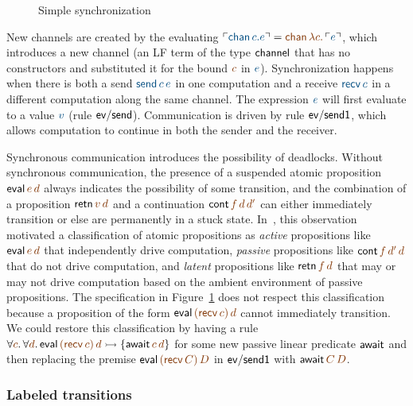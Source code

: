 \begin{figure}
\caption{Simple synchronization}
\label{fig:dest-synch}
\end{figure}

New channels are created by the evaluating $\interp{{\sf chan}\,c.e} =
\lf{{\sf chan}\,\lambda c.\,\interp{e}}$, which introduces a new channel
(an LF term of the type ${\sf channel}$ that has no constructors and
substituted it for the bound $\lf{c}$ in $\obj{e}$). 
Synchronization happens when
there is both a send $\obj{{\sf send}\,c\,e}$ in one computation and a
receive $\obj{{\sf recv}\,c}$ in a different computation along the same
channel. The expression $\obj{e}$ will first evaluate to a value $\obj{v}$ 
(rule ${\sf ev/send}$). Communication is
driven by rule ${\sf ev/send1}$, which allows computation to continue
in both the sender and the receiver.

Synchronous communication introduces the possibility of
deadlocks. Without synchronous communication, the presence of a
suspended atomic proposition ${\sf eval}\,\lf{e}\,\lf{d}$ always
indicates the possibility of some transition, and the combination of a
proposition ${\sf retn}\,\lf{v}\,\lf{d}$ and a continuation ${\sf
  cont}\,\lf{f}\,\lf{d}\,\lf{d'}$ can either immediately transition or
else are permanently in a stuck
state. In~\cite{pfenning09substructural}, this observation motivated a
classification of atomic propositions as {\it active} propositions
like ${\sf eval}\,\lf{e}\,\lf{d}$ that independently drive
computation, {\it passive} propositions like ${\sf
  cont}\,\lf{f}\,\lf{d'}\,\lf{d}$ that do not drive computation, and
{\it latent} propositions like ${\sf retn}\,\lf{f}\,\lf{d}$ that may
or may not drive computation based on the ambient environment of
passive propositions. The specification in Figure~\ref{fig:dest-synch}
does not respect this classification because a proposition of the form
${\sf eval}\,\lf{({\sf recv}\,c)}\,\lf{d}$ cannot immediately
transition. We could restore this classification by having a rule
$\forall \lf{c}.\,\forall \lf{d}.\, {\sf eval}\,\lf{({\sf
    recv}\,c)}\,\lf{d} \lefti \{ {\sf await}\,\lf{c}\,\lf{d} \}$ for
some new passive linear predicate ${\sf await}$ and then replacing the
premise ${\sf eval}\,\lf{({\sf recv}\,C)}\,\lf{D}$ in ${\sf ev/send1}$
with ${\sf await}\,\lf{C}\,\lf{D}$.

\subsubsection{Labeled transitions}

